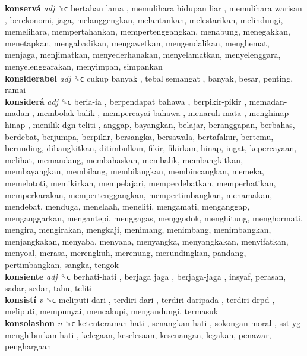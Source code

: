 \textbf{konservá} \emph{adj}  ␝ϲ   bertahan lama ,  memulihara hidupan liar ,  memulihara warisan , berekonomi, jaga, melanggengkan, melantankan, melestarikan, melindungi, memelihara, mempertahankan, mempertenggangkan, menabung, menegakkan, menetapkan, mengabadikan, mengawetkan, mengendalikan, menghemat, menjaga, menjimatkan, menyederhanakan, menyelamatkan, menyelenggara, menyelenggarakan, menyimpan, simpankan  \\
\textbf{konsiderabel} \emph{adj}  ␝ϲ   cukup banyak ,  tebal semangat , banyak, besar, penting, ramai  \\
\textbf{konsiderá} \emph{adj}  ␝ϲ   beria-ia ,  berpendapat bahawa ,  berpikir-pikir ,  memadan-madan ,  membolak-balik ,  mempercayai bahawa ,  menaruh mata ,  menghinap-hinap ,  menilik dgn teliti , anggap, bayangkan, belajar, beranggapan, berbahas, berdebat, berjumpa, berpikir, bersangka, bersawala, bertafakur, bertemu, berunding, dibangkitkan, ditimbulkan, fikir, fikirkan, hinap, ingat, kepercayaan, melihat, memandang, membahaskan, membalik, membangkitkan, membayangkan, membilang, membilangkan, membincangkan, memeka, memelototi, memikirkan, mempelajari, memperdebatkan, memperhatikan, memperkarakan, mempertenggangkan, mempertimbangkan, menamakan, mendebat, menduga, menelaah, meneliti, mengamati, menganggap, menganggarkan, mengantepi, menggagas, menggodok, menghitung, menghormati, mengira, mengirakan, mengkaji, menimang, menimbang, menimbangkan, menjangkakan, menyaba, menyana, menyangka, menyangkakan, menyifatkan, menyoal, merasa, merengkuh, merenung, merundingkan, pandang, pertimbangkan, sangka, tengok  \\
\textbf{konsiente} \emph{adj}  ␝ϲ   berhati-hati ,  berjaga jaga ,  berjaga-jaga , insyaf, perasan, sadar, sedar, tahu, teliti  \\
\textbf{konsistí} \emph{v}  ␝ϲ   meliputi dari ,  terdiri dari ,  terdiri daripada ,  terdiri drpd , meliputi, mempunyai, mencakupi, mengandungi, termasuk  \\
\textbf{konsolashon} \emph{n}  ␝ϲ   ketenteraman hati ,  senangkan hati ,  sokongan moral ,  sst yg menghiburkan hati , kelegaan, keselesaan, kesenangan, legakan, penawar, penghargaan  \\
